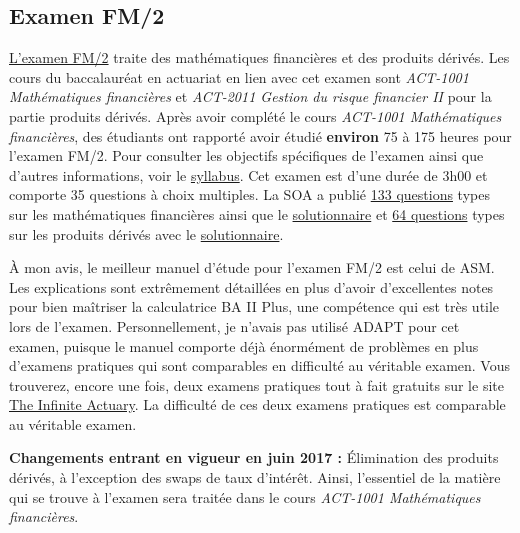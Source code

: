 \documentclass[11pt,french]{article}
\begin{document}
\subsection*{Examen FM/2}
\label{subsec:examfm}
\href{https://www.soa.org/education/exam-req/edu-exam-fm-detail.aspx}{L'examen FM/2} traite des mathématiques financières et des produits dérivés. Les cours du baccalauréat en actuariat en lien avec cet examen sont \textit{ACT-1001 Mathématiques financières} et \textit{ACT-2011 Gestion du risque financier II} pour la partie produits dérivés. Après avoir complété le cours \textit{ACT-1001 Mathématiques financières}, des étudiants ont rapporté avoir étudié \textbf{environ} 75 à 175 heures pour l'examen FM/2. Pour consulter les objectifs spécifiques de l'examen ainsi que d'autres informations, voir le \href{https://www.soa.org/Files/Edu/2017/edu-2017-02-exam-fm-syllabus.pdf}{syllabus}. Cet examen est d'une durée de 3h00 et comporte 35 questions à choix multiples. La SOA a publié \href{https://www.soa.org/Files/Edu/2015/edu-2015-exam-fm-ques-theory.pdf}{133 questions} types sur les mathématiques financières ainsi que le \href{https://www.soa.org/Files/Edu/2015/edu-2015-exam-fm-sol-theory.pdf}{solutionnaire} et \href{https://www.soa.org/Files/Edu/edu-2014-10-exam-fm-ques.pdf}{64 questions} types sur les produits dérivés avec le \href{https://www.soa.org/Files/Edu/edu-2014-10-exam-fm-sol.pdf}{solutionnaire}.\vspace{\baselineskip} 

À mon avis, le meilleur manuel d'étude pour l'examen FM/2 est celui de ASM. Les explications sont extrêmement détaillées en plus d'avoir d'excellentes notes pour bien maîtriser la calculatrice BA II Plus, une compétence qui est très utile lors de l'examen. Personnellement, je n'avais pas utilisé ADAPT pour cet examen, puisque le manuel comporte déjà énormément de problèmes en plus d'examens pratiques qui sont comparables en difficulté au véritable examen. Vous trouverez, encore une fois, deux examens pratiques tout à fait gratuits sur le site \href{http://www.theinfiniteactuary.com/exams/2}{The Infinite Actuary}. La difficulté de ces deux examens pratiques est comparable au véritable examen.\vspace{\baselineskip} 

\textbf{Changements entrant en vigueur en juin 2017 :} Élimination des produits dérivés, à l’exception des swaps de taux d’intérêt. Ainsi, l'essentiel de la matière qui se trouve à l'examen sera traitée dans le cours \textit{ACT-1001 Mathématiques financières}.
\end{document}

